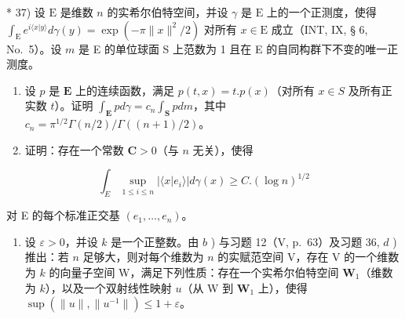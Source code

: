 * 37) 设 \(\mathrm{E}\) 是维数 \(n\) 的实希尔伯特空间，并设 \(\gamma\) 是 \(\mathrm{E}\) 上的一个正测度，使得 \(\int_{\mathrm{E}} e^{i\langle x|y\rangle} d\gamma(y) = \exp(-\pi \|x\|^2/2)\) 对所有 \(x \in \mathrm{E}\) 成立（INT, IX, § 6, No.~5）。设 \(m\) 是 E 的单位球面 S 上范数为 1 且在 E 的自同构群下不变的唯一正测度。

\begin{enumerate}
\def\labelenumi{\alph{enumi})}
\item
  设 \(p\) 是 \(\mathbf{E}\) 上的连续函数，满足 \(p(t,x) = t.p(x)\)（对所有 \(x\in S\) 及所有正实数 \(t\)）。证明 \(\int_{\mathbf{E}}pd\gamma = c_n\int_{\mathbf{S}}pdm\)，其中 \(c_{n} = \pi^{1 / 2}\Gamma (n / 2) / \Gamma ((n + 1) / 2)\)。
\item
  证明：存在一个常数 \(\mathbf{C} > 0\)（与 \(n\) 无关），使得
\end{enumerate}

\[
\int_ {E} \sup _ {1 \leqslant i \leqslant n} | \langle x | e _ {i} \rangle | d \gamma (x) \geqslant C. (\log n) ^ {1 / 2}
\]

对 E 的每个标准正交基 \((e_1, \dots, e_n)\)。

\begin{enumerate}
\def\labelenumi{\alph{enumi})}
\setcounter{enumi}{2}
\tightlist
\item
  设 \(\varepsilon > 0\)，并设 \(k\) 是一个正整数。由 \(b\) ) 与习题 12（V, p.~63）及习题 36, \(d\) ) 推出：若 \(n\) 足够大，则对每个维数为 \(n\) 的实赋范空间 V，存在 V 的一个维数为 \(k\) 的向量子空间 W，满足下列性质：存在一个实希尔伯特空间 \(\mathbf{W}_1\)（维数为 \(k\)），以及一个双射线性映射 \(u\)（从 W 到 \(\mathbf{W}_1\) 上），使得 \(\sup (\| u \|, \| u^{-1} \|) \leqslant 1 + \varepsilon\)。
\end{enumerate}

